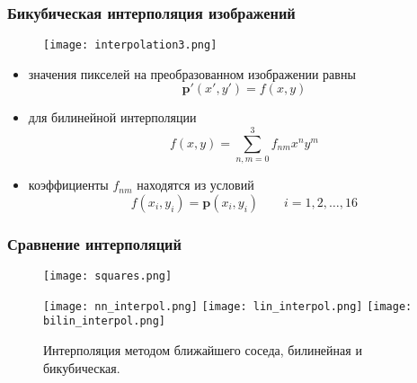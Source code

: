\documentclass[
    12pt, 
    usepdftitle=false,
    aspectratio=1610
]{beamer}
\begin{document}
\begin{frame}
    \frametitle{Бикубическая интерполяция изображений}
    \begin{figure}[t]
        \texttt{[image: interpolation3.png]}
    \end{figure}
    \begin{itemize}
        \item значения пикселей на преобразованном изображении равны
        $$
            \mathbf{p}'\left(x',y'\right)=f(x,y)
        $$
        \item для билинейной интерполяции
        $$
            f(x,y)=\sum_{n,m=0}^3 f_{nm}x^ny^m
        $$
        \item коэффициенты $f_{nm}$ находятся из условий
        $$
            f(x_i,y_i)=\mathbf{p}(x_i, y_i)\qquad i=1,2,\ldots,16
        $$
    \end{itemize}
\end{frame}

\begin{frame}
    \frametitle{Сравнение интерполяций}
    \begin{figure}[t]
        \texttt{[image: squares.png]}
    \end{figure}
    \begin{figure}[t]
        \texttt{[image: nn\_interpol.png]}
        \texttt{[image: lin\_interpol.png]}
        \texttt{[image: bilin\_interpol.png]}
        \caption*{Интерполяция методом ближайшего соседа, билинейная и бикубическая.}
    \end{figure}

\end{frame}

\end{document}
